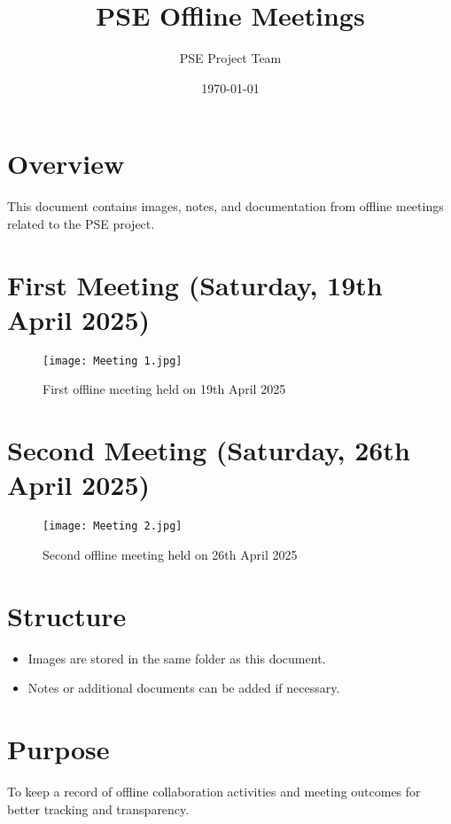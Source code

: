 \documentclass{article}
\title{PSE Offline Meetings}
\author{PSE Project Team}
\date{\today}
\begin{document}
\maketitle

\section*{Overview}

This document contains images, notes, and documentation from offline meetings related to the PSE project.

\section*{First Meeting (Saturday, 19th April 2025)}

\begin{figure}[H]
    \centering
    \texttt{[image: Meeting 1.jpg]}
    \caption{First offline meeting held on 19th April 2025}
\end{figure}

\section*{Second Meeting (Saturday, 26th April 2025)}

\begin{figure}[H]
    \centering
    \texttt{[image: Meeting 2.jpg]}
    \caption{Second offline meeting held on 26th April 2025}
\end{figure}

\section*{Structure}

\begin{itemize}
    \item Images are stored in the same folder as this document.
    \item Notes or additional documents can be added if necessary.
\end{itemize}

\section*{Purpose}

To keep a record of offline collaboration activities and meeting outcomes for better tracking and transparency.
\end{document}
